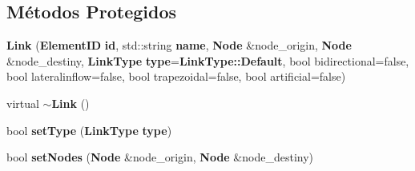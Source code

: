 \subsection*{Métodos Protegidos}
\begin{DoxyCompactItemize}
\item 
{\bf Link} ({\bf Element\+ID} {\bf id}, std\+::string {\bf name}, {\bf Node} \&node\+\_\+origin, {\bf Node} \&node\+\_\+destiny, {\bf Link\+Type} {\bf type}={\bf Link\+Type\+::\+Default}, bool bidirectional=false, bool lateralinflow=false, bool trapezoidal=false, bool artificial=false)
\item 
virtual {\bf $\sim$\+Link} ()
\item 
bool {\bf set\+Type} ({\bf Link\+Type} {\bf type})
\item 
bool {\bf set\+Nodes} ({\bf Node} \&node\+\_\+origin, {\bf Node} \&node\+\_\+destiny)
\end{DoxyCompactItemize}
